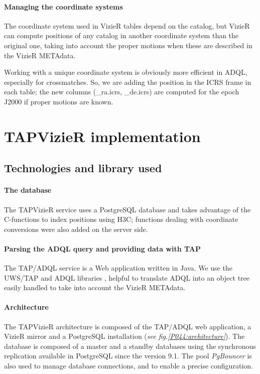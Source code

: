 \paragraph{Managing the coordinate systems}

The coordinate system used in VizieR tables depend on the catalog, but VizieR 
can compute positions of any catalog in another coordinate system than the 
original one, taking into account the proper motions when these are 
described in the VizieR METAdata.

Working with a unique coordinate system is obviously more efficient
in ADQL, especially for crossmatches. So, we are adding the position in 
the ICRS frame in each table; 
the new columns (\_ra.icrs, \_de.icrs) are computed for the epoch J2000 
if proper motions are known.


\section{TAPVizieR implementation}

\subsection{Technologies and library used}
\paragraph{The database}


The TAPVizieR service uses a PostgreSQL database and takes advantage of the
C-functions to index positions using H3C;  functions dealing with 
coordinate conversions were also added on the server side.

\paragraph{Parsing the ADQL query and providing data with TAP}

The TAP/ADQL service is a Web application written in Java. 
We use the UWS/TAP and ADQL libraries \citep{simbad_tap_2011}, 
helpful to translate ADQL into an object tree 
easily handled to take into account the VizieR METAdata. 

\paragraph{Architecture}
The TAPVizieR architecture is composed of the TAP/ADQL web application, a VizieR
mirror and a PostgreSQL installation (\textit{see fig.\ref{P044:architecture}}).
The database is composed of a master and a standby databases using
the synchronous replication available in PostgreSQL since the version 9.1.
The pool {\em PgBouncer} is also used to manage database connections, and to
enable a precise configuration. 

